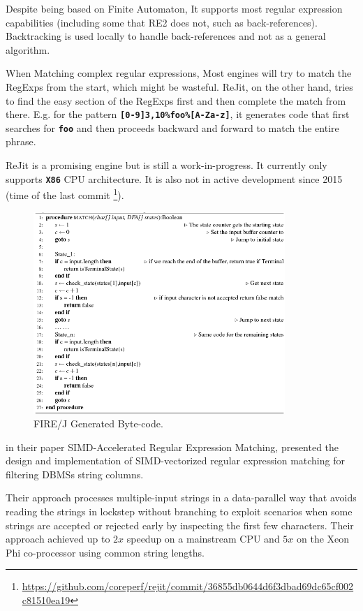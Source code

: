 Despite being based on Finite Automaton, It supports most regular expression capabilities (including some that RE2 does not, such as back-references). Backtracking is used locally to handle back-references and not as a general algorithm.

When Matching complex regular expressions, Most engines will try to match the RegExps from the start, which might be wasteful. ReJit, on the other hand, tries to find the easy section of the RegExps first and then complete the match from there. E.g. for the pattern \texttt{\textbf{[0-9]{3,10}\%foo\%[A-Za-z]}}, it generates code that first searches for \texttt{\textbf{foo}} and then proceeds backward and forward to match the entire phrase.

ReJit is a promising engine but is still a work-in-progress. It currently only supports \texttt{\textbf{X86}} CPU architecture. It is also not in active development since 2015 (time of the last commit \footnote{\url{https://github.com/coreperf/rejit/commit/36855db0644d6f3dbad69dc65cf002c81510ea19}}).

\begin{figure}[H]
\includegraphics[width=0.85\textwidth]{imgs/alg-byte-firej.png}
\caption{FIRE/J \cite{firejpaper} Generated Byte-code.}\label{fig:firejpaper}
\end{figure}


\citet{simdregextpch} in their paper SIMD-Accelerated Regular Expression Matching, presented the design and implementation of SIMD-vectorized regular expression matching for filtering DBMSs string columns. 

Their approach processes multiple-input strings in a data-parallel way that avoids reading the strings in lockstep without branching to exploit scenarios when some strings are accepted or rejected early by inspecting the first few characters. Their approach achieved up to $2x$ speedup on a mainstream CPU and $5x$ on the Xeon Phi co-processor using common string lengths.


